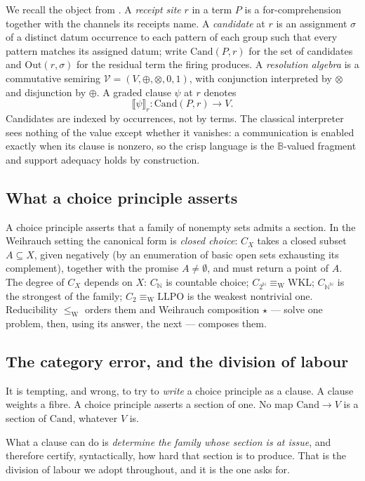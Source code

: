 \documentclass[11pt]{article}
\theoremstyle{definition}
\theoremstyle{plain}
\theoremstyle{remark}
\newcommand{\V}{\mathcal{V}}
\newcommand{\sumv}{\oplus}
\newcommand{\tensorv}{\otimes}
\newcommand{\Bool}{\mathbb{B}}
\newcommand{\Cand}{\mathrm{Cand}}
\newcommand{\Out}{\mathrm{Out}}
\newcommand{\sem}[1]{\llbracket #1 \rrbracket}
\newcommand{\LLPO}{\mathrm{LLPO}}
\newcommand{\WKL}{\mathrm{WKL}}
\newcommand{\lw}{\leq_{\mathrm{W}}}
\newcommand{\ew}{\equiv_{\mathrm{W}}}
\newcommand{\Wstar}{\star}
\newcommand{\Bai}{\mathbb{N}^{\mathbb{N}}}
\newcommand{\Can}{2^{\mathbb{N}}}
\begin{document}
We recall the object from \cite{gradedwhere}. A \emph{receipt site} $r$ in a term $P$
is a for-comprehension together with the channels its receipts name. A
\emph{candidate} at $r$ is an assignment $\sigma$ of a distinct datum occurrence to
each pattern of each group such that every pattern matches its assigned datum; write
$\Cand(P,r)$ for the set of candidates and $\Out(r,\sigma)$ for the residual term the
firing produces. A \emph{resolution algebra} is a commutative semiring
$\V = (V,\sumv,\tensorv,0,1)$, with conjunction interpreted by $\tensorv$ and
disjunction by $\sumv$. A graded clause $\psi$ at $r$ denotes
\[
  \sem{\psi}_r : \Cand(P,r) \longrightarrow V .
\]
Candidates are indexed by occurrences, not by terms. The classical interpreter sees
nothing of the value except whether it vanishes: a communication is enabled exactly
when its clause is nonzero, so the crisp language is the $\Bool$-valued fragment and
support adequacy holds by construction.

\subsection{What a choice principle asserts}

A choice principle asserts that a family of nonempty sets admits a section. In the
Weihrauch setting \cite{weihrauch} the canonical form is \emph{closed choice}: $C_X$
takes a closed subset $A \subseteq X$, given negatively (by an enumeration of basic
open sets exhausting its complement), together with the promise $A \neq \emptyset$,
and must return a point of $A$. The degree of $C_X$ depends on $X$: $C_{\mathbb{N}}$ is
countable choice; $C_{\Can} \ew \WKL$; $C_{\Bai}$ is the strongest of the family;
$C_2 \ew \LLPO$ is the weakest nontrivial one. Reducibility $\lw$ orders them and
Weihrauch composition $\Wstar$ --- solve one problem, then, using its answer, the next
--- composes them.

\subsection{The category error, and the division of labour}

It is tempting, and wrong, to try to \emph{write} a choice principle as a clause. A
clause weights a fibre. A choice principle asserts a section of one. No map
$\Cand \to V$ is a section of $\Cand$, whatever $V$ is.

What a clause can do is \emph{determine the family whose section is at issue}, and
therefore certify, syntactically, how hard that section is to produce. That is the
division of labour we adopt throughout, and it is the one \cite{agency} asks for.
\end{document}
